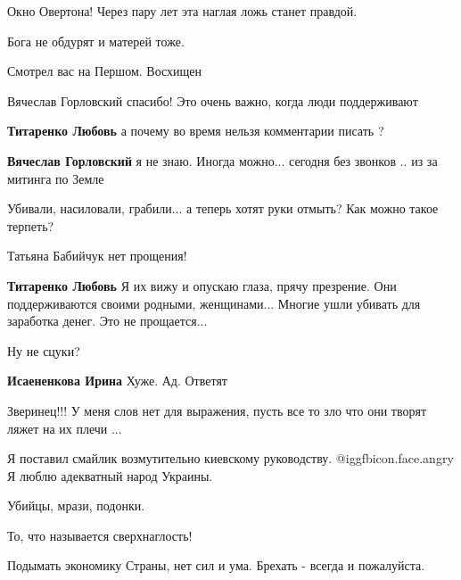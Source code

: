 Окно Овертона! Через пару лет эта наглая ложь станет правдой.


Бога не обдурят и матерей тоже.


Смотрел вас на Першом. Восхищен


Вячеслав Горловский спасибо! Это очень важно, когда люди поддерживают


\textbf{Титаренко Любовь} а почему во время нельзя комментарии писать ?


\textbf{Вячеслав Горловский} я не знаю. Иногда можно... сегодня без звонков .. из
за митинга по Земле


Убивали, насиловали, грабили... а теперь хотят руки отмыть? Как можно такое терпеть?


Татьяна Бабийчук нет прощения!


\textbf{Титаренко Любовь} Я их вижу и опускаю глаза, прячу презрение. Они
поддерживаются своими родными, женщинами... Многие ушли убивать для заработка
денег. Это не прощается...


Ну не сцуки?


\textbf{Исаененкова Ирина} Хуже. Ад. Ответят


Зверинец!!! У меня слов нет для выражения, пусть все то зло что они творят ляжет на их плечи ...


Я поставил смайлик возмутительно киевскому руководству. @igg{fbicon.face.angry}  Я люблю адекватный
народ Украины.


Убийцы, мрази, подонки.


То, что называется сверхнаглость!


Подымать экономику Страны, нет сил и ума. Брехать - всегда и пожалуйста.

